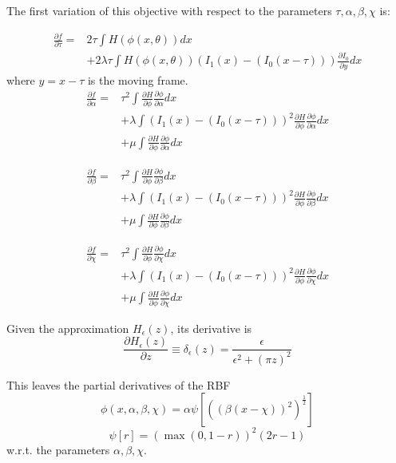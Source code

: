\documentclass[]{paper}
\begin{document}
The first variation of this objective with respect to the parameters
$\tau, \alpha, \beta, \chi$ is:

\begin{eqnarray*}
\frac{\partial f}{\partial \tau} = & 2\tau\int H(\phi(x,\theta)) dx \\
& + 2\lambda\tau \int H(\phi(x,\theta))\left (I_1(x) - (I_0(x-\tau))
\right )\frac{\partial I_0}{\partial y} dx
\end{eqnarray*}
where $y = x - \tau$ is the moving frame.
\begin{eqnarray*}
\frac{\partial f}{\partial \alpha} = & \tau^2\int \frac{\partial
  H}{\partial \phi}\frac{\partial \phi}{\partial \alpha} dx \\
& + \lambda \int \left (I_1(x) - (I_0(x-\tau)) \right )^2 \frac{\partial
  H}{\partial \phi}\frac{\partial \phi}{\partial \alpha} dx \\
& + \mu \int \frac{\partial
  H}{\partial \phi}\frac{\partial \phi}{\partial \alpha} dx
\end{eqnarray*}

\begin{eqnarray*}
\frac{\partial f}{\partial \beta} = & \tau^2\int \frac{\partial
  H}{\partial \phi}\frac{\partial \phi}{\partial \beta} dx \\
& + \lambda \int \left (I_1(x) - (I_0(x-\tau)) \right )^2 \frac{\partial
  H}{\partial \phi}\frac{\partial \phi}{\partial \beta} dx \\
& + \mu \int \frac{\partial
  H}{\partial \phi}\frac{\partial \phi}{\partial \beta} dx
\end{eqnarray*}

\begin{eqnarray*}
\frac{\partial f}{\partial \chi} = & \tau^2\int \frac{\partial
  H}{\partial \phi}\frac{\partial \phi}{\partial \chi} dx \\
& + \lambda \int \left (I_1(x) - (I_0(x-\tau)) \right )^2 \frac{\partial
  H}{\partial \phi}\frac{\partial \phi}{\partial \chi} dx \\
& + \mu \int \frac{\partial
  H}{\partial \phi}\frac{\partial \phi}{\partial \chi} dx
\end{eqnarray*}

\par
Given the approximation $H_\epsilon(z)$, its derivative is
\[
\frac{\partial H_\epsilon(z)}{\partial z} \equiv \delta_\epsilon(z) = 
\frac{\epsilon}{\epsilon^2 + (\pi z)^2}
\]
\par
This leaves the partial derivatives of the RBF 
\[
\phi(x,\alpha,\beta,\chi) = \alpha \psi \left [ ((\beta(x-\chi))^2)^\frac{1}{2}\right ]
\]
\[
\psi[r] = \left ( \max{(0,1-r)} \right )^2(2r-1)
\]
w.r.t. the parameters $\alpha, \beta, \chi$.
\end{document}
